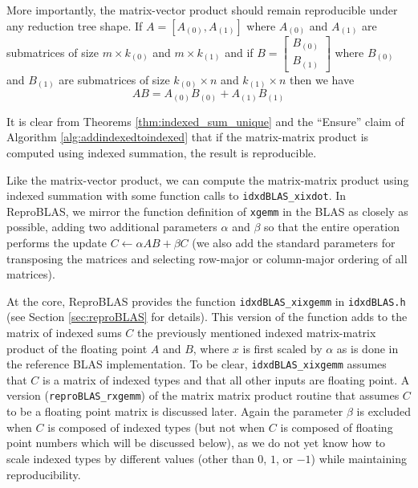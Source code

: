  More importantly, the matrix-vector product should remain reproducible under any reduction tree shape.
  If $A = [A_{(0)}, A_{(1)}]$ where $A_{(0)}$ and $A_{(1)}$ are submatrices of size $m \times k_{(0)}$ and $m \times k_{(1)}$ and if $B = \left[\begin{array}{c}B_{(0)}\\ B_{(1)}\end{array}\right]$ where $B_{(0)}$ and $B_{(1)}$ are submatrices of size $k_{(0)} \times n$ and $k_{(1)} \times n$ then we have 
  \begin{equation}
    AB = A_{(0)}B_{(0)} + A_{(1)}B_{(1)}
    \label{eq:gemmblock}
  \end{equation}

  It is clear from Theorems \ref{thm:indexed_sum_unique} and the ``Ensure'' claim of Algorithm \ref{alg:addindexedtoindexed} that if the matrix-matrix product is computed using indexed summation, the result is reproducible.

  Like the matrix-vector product, we can compute the matrix-matrix product using indexed summation with some function calls to \texttt{idxdBLAS\_xixdot}. In ReproBLAS, we mirror the function definition of \texttt{xgemm} in the BLAS as closely as possible, adding two additional parameters $\alpha$ and $\beta$ so that the entire operation performs the update $C \gets \alpha AB + \beta C$ (we also add the standard parameters for transposing the matrices and selecting row-major or column-major ordering of all matrices).

  At the core, ReproBLAS provides the function \texttt{idxdBLAS\_xixgemm} in \texttt{idxdBLAS.h} (see Section \ref{sec:reproBLAS} for details). This version of the function adds to the matrix of indexed sums $C$ the previously mentioned indexed matrix-matrix product of the floating point $A$ and $B$, where $x$ is first scaled by $\alpha$ as is done in the reference BLAS implementation. 
To be clear, \texttt{idxdBLAS\_xixgemm} assumes that $C$ is a matrix of indexed types and that all other inputs are floating point. A version (\texttt{reproBLAS\_rxgemm}) of the matrix matrix product routine that assumes $C$ to be a floating point matrix is discussed later. 
Again the parameter $\beta$ is excluded when $C$ is composed of indexed types (but not when $C$ is composed of floating point numbers which will be discussed below), as we do not yet know how to scale indexed types by different values (other than $0$, $1$, or $-1$) while maintaining reproducibility.

